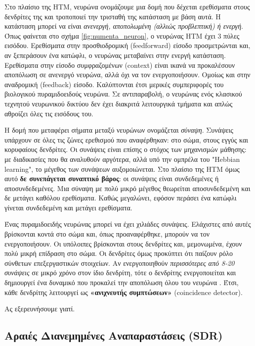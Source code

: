 	Στο πλαίσιο της HTM, νευρώνα ονομάζουμε μια δομή που δέχεται ερεθίσματα στους δενδρίτες της και τροποποιεί την τρισταθή της κατάσταση με βάση αυτά.
	Η κατάσταση μπορεί να είναι \textit{ανενεργή, αποπολωμένη (αλλιώς προβλεπτική) ή ενεργή}.
	Όπως φαίνεται στο σχήμα \ref{fig:numenta_neuron}, ο νευρώνας HTM έχει 3 πύλες εισόδου.
	Ερεθίσματα στην προσθιοδρομική (feedforward) είσοδο προσμετρώνται και, αν ξεπεράσουν ένα κατώφλι, ο νευρώνας μεταβαίνει στην ενεργή κατάσταση.
	Ερεθίσματα στην είσοδο συμφραζομένων (context) είναι ικανά να προκαλέσουν αποπόλωση σε ανενεργό νευρώνα, αλλά όχι να τον ενεργοποιήσουν.
	Ομοίως και στην αναδρομική (feedback) είσοδο.
	Καλύπτονται έτσι μερικές συμπεριφορές του βιολογικού πυραμιδοειδούς νευρώνα.
	Σε αντιπαραβολή, ο νευρώνας ενός κλασικού τεχνητού νευρωνικού δικτύου δεν έχει διακριτά λειτουργικά τμήματα και απλώς αθροίζει όλες τις εισόδους του.

	Η δομή που μεταφέρει σήματα μεταξύ νευρώνων ονομάζεται \textit{σύναψη}. Συνάψεις υπάρχουν σε όλες τις ζώνες ερεθισμού που αναφέρθηκαν:
	στο σώμα, στους εγγύς και κορυφαίους δενδρίτες.
	Οι συνάψεις είναι επίσης ο στόχος των μηχανισμών μάθησης: με διαδικασίες που θα αναλυθούν αργότερα, αλλά υπό την ομπρέλα του "Hebbian learning",
	το μέγεθος των συνάψεων αυξομοιώνεται.
	Στο πλαίσιο της HTM όμως αυτό \textbf{δε συνεπάγεται συναπτικό βάρος}: οι συνάψεις είναι συνδεδεμένες ή αποσυνδεδεμένες.
	Μια σύναψη με πολύ μικρό μέγεθος θεωρείται αποσυνδεδεμένη και δε μετάγει καθόλου ερεθίσματα.
	Καθώς μεγαλώνει, εφόσον περάσει ένα κατώφλι γίνεται συνδεδεμένη και μετάγει ερεθίσματα.

	Ένας πυραμιδοειδής νευρώνας μπορεί να έχει χιλιάδες συνάψεις. Ελάχιστες από αυτές βρίσκονται κοντά στο σώμα και, όπως προαναφέρθηκε, μπορούν να τον ενεργοποιήσουν.
	Οι υπόλοιπες βρίσκονται στους δενδρίτες και, μεμονωμένα, έχουν πολύ μικρή επίδραση στο σώμα.
	Οι δενδρίτες όμως προκύπτει ότι παίζουν ρόλο σύνθετων επεξεργαστικών στοιχείων.
	Αν ενεργοποιηθούν \textit{περισσότερες από 8-20 συνάψεις} σε μικρό χρόνο στον ίδιο δενδρίτη, τότε ο δενδρίτης ενεργοποιείται και δημιουργεί ένα δυναμικό που προκαλεί την αποπόλωση όλου του νευρώνα \parencite{hawkinsWhyNeuronsHave2016}.
	Έτσι, κάθε δενδρίτης λειτουργεί ως \textbf{«ανιχνευτής συμπτώσεων»} (coincidence detector).

	Ας εξερευνήσουμε γιατί.


\subsection{Αραιές Διανεμημένες Αναπαραστάσεις (SDR)}

